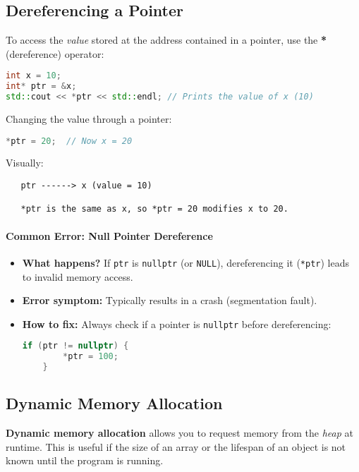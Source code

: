 \documentclass[a4paper,12pt]{article}
\begin{document}
\subsection{Dereferencing a Pointer}

To access the \textit{value} stored at the address contained in a pointer, use the \textbf{*} (dereference) operator:

\begin{lstlisting}[language=C++]
int x = 10;
int* ptr = &x;
std::cout << *ptr << std::endl; // Prints the value of x (10)
\end{lstlisting}

Changing the value through a pointer:
\begin{lstlisting}[language=C++]
*ptr = 20;  // Now x = 20
\end{lstlisting}

Visually:

\begin{verbatim}
   ptr ------> x (value = 10)

   *ptr is the same as x, so *ptr = 20 modifies x to 20.
\end{verbatim}

\paragraph{Common Error: Null Pointer Dereference}
\begin{itemize}
    \item \textbf{What happens?} If \texttt{ptr} is \texttt{nullptr} (or \texttt{NULL}), dereferencing it (\texttt{*ptr}) leads to invalid memory access.
    \item \textbf{Error symptom:} Typically results in a crash (segmentation fault).
    \item \textbf{How to fix:} Always check if a pointer is \texttt{nullptr} before dereferencing:
    \begin{lstlisting}[language=C++]
    if (ptr != nullptr) {
        *ptr = 100;
    }
    \end{lstlisting}
\end{itemize}

\subsection{Dynamic Memory Allocation}

\textbf{Dynamic memory allocation} allows you to request memory from the \emph{heap} at runtime. This is useful if the size of an array or the lifespan of an object is not known until the program is running.  
\end{document}
